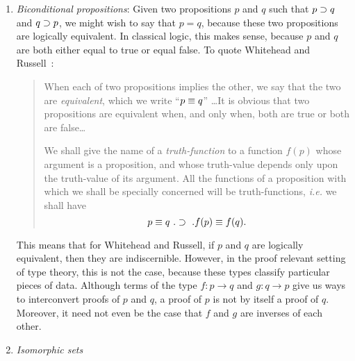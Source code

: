 \documentclass[12pt]{article}
\begin{document}
\begin{enumerate}

\item \emph{Biconditional propositions}: Given two propositions $p$ and $q$
such that $p \supset q$ and $q \supset p$, we might wish to say that $p = q$,
because these two propositions are logically equivalent. In classical logic,
this makes sense, because $p$ and $q$ are both either equal to true or equal
false. To quote Whitehead and Russell~\cite[p.115]{Whitehead63}:

\begin{quotation}

When each of two propositions implies the other, we say that the two are
\emph{equivalent}, which we write ``$p \equiv q$'' \dots It is obvious that two
propositions are equivalent when, and only when, both are true or both are
false\dots

We shall give the name of a \emph{truth-function} to a function
$f(p)$ whose argument is a proposition, and whose truth-value
depends only upon the truth-value of its argument. All the functions
of a proposition with which we shall be specially concerned will be
truth-functions, \emph{i.e.} we shall have
%
\begin{equation*}
p \equiv q \ . \supset \ . f(p) \equiv f(q) . 
\end{equation*}
%
\end{quotation}

This means that for Whitehead and Russell, if $p$ and $q$ are logically
equivalent, then they are indiscernible. However, in the proof relevant setting
of type theory, this is not the case, because these types classify particular
pieces of data.  Although terms of the type $f : p \to q$ and $g : q \to p$
give us ways to interconvert proofs of $p$ and $q$, a proof of $p$ is not by
itself a proof of $q$.  Moreover, it need not even be the case that $f$ and $g$
are inverses of each other.

\item \emph{Isomorphic sets}

\end{enumerate}



\end{document}
